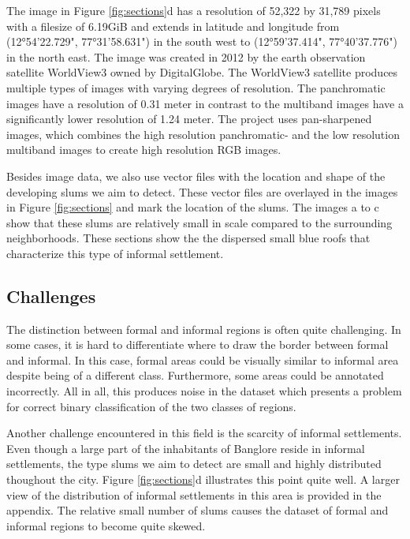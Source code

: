 The image in Figure \ref{fig:sections}d has a resolution of 52,322 by 31,789 pixels with a filesize of 6.19GiB and extends in latitude and longitude from  (12°54'22.729", 77°31'58.631") in the south west to (12°59'37.414", 77°40'37.776") in the north east. The image was created in 2012 by the earth observation satellite WorldView3 owned by DigitalGlobe. The WorldView3 satellite produces multiple types of images with varying degrees of resolution. The panchromatic images have a resolution of 0.31 meter in contrast to  the multiband images have a significantly lower resolution of 1.24 meter. The project uses pan-sharpened images, which combines the high resolution panchromatic- and the low resolution multiband images to create high resolution RGB images.

Besides image data, we also use vector files with the location and shape of the developing slums we aim to detect. These vector files are overlayed in the images in Figure \ref{fig:sections} and mark the location of the slums. The images a to c show that these slums are relatively small in scale compared to the surrounding neighborhoods. These sections show the the dispersed small blue roofs that characterize this type of informal settlement. 

\subsection{Challenges}

The distinction between formal and informal regions is often quite challenging. In some cases, it is hard to differentiate where to draw the border between formal and informal. In this case, formal areas could be visually similar to informal area despite being of a different class. Furthermore, some areas could be annotated incorrectly. All in all, this produces noise in the dataset which presents a problem for correct binary classification of the two classes of regions.

Another challenge encountered in this field is the scarcity of informal settlements.  Even though a large part of the inhabitants of Banglore reside in informal settlements, the type slums we aim to detect are small and highly distributed thoughout the city. Figure \ref{fig:sections}d illustrates this point quite well. A larger view of the distribution of informal settlements in this area is provided in the appendix. The relative small number of slums causes the dataset of formal and informal regions to become quite skewed.


